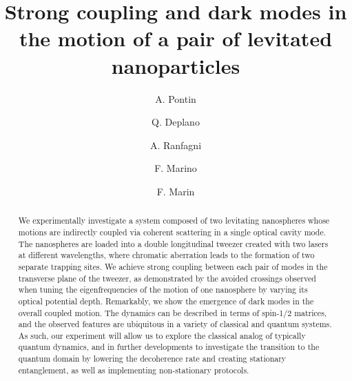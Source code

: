 \documentclass[aps,preprint,singlecolumn,nopacs,superscriptaddress,groupedaddress]{revtex4}
\begin{document}
\title[]{Strong coupling and dark modes in the motion of a pair of levitated nanoparticles }


\author{A. Pontin}

\author{Q. Deplano}%
%

\author{A. Ranfagni}%
%

\author{F. Marino}%


\author{F. Marin}
%


\begin{abstract}
We experimentally investigate a system composed of two levitating nanospheres whose motions are indirectly coupled via coherent scattering in a single optical cavity mode. The nanospheres are loaded into a double longitudinal tweezer created with two lasers at different wavelengths, where chromatic aberration leads to the
formation of two separate trapping sites. We achieve strong coupling between each pair of modes in the transverse plane of the tweezer, as demonstrated by the avoided crossings observed when tuning the eigenfrequencies of the motion of one nanosphere by varying its optical potential depth. Remarkably, we show the emergence of dark modes in the overall coupled motion. The dynamics can be described in terms of spin-1/2 matrices, and the observed features are ubiquitous in a variety of classical and quantum systems. As such, our experiment will allow us to explore the classical analog of typically quantum dynamics, and in further developments to investigate the transition to the quantum domain by lowering the decoherence rate and creating stationary entanglement, as well as implementing non-stationary protocols.
\end{abstract}
\end{document}
